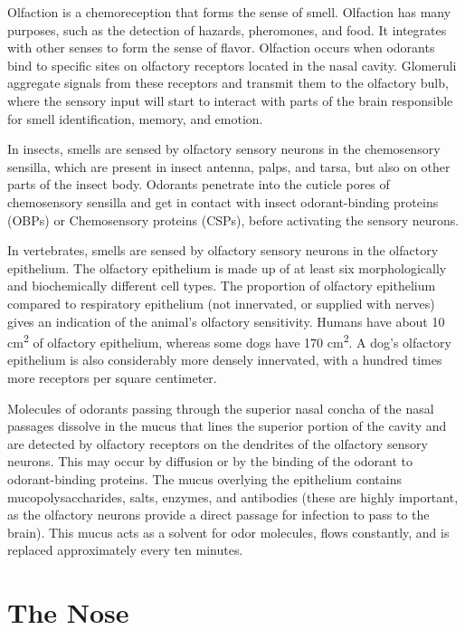 Olfaction is a chemoreception that forms the sense of smell. Olfaction has many purposes, such as the detection of hazards, pheromones, and food. It integrates with other senses to form the sense of flavor. Olfaction occurs when odorants bind to specific sites on olfactory receptors located in the nasal cavity. Glomeruli aggregate signals from these receptors and transmit them to the olfactory bulb, where the sensory input will start to interact with parts of the brain responsible for smell identification, memory, and emotion.

In insects, smells are sensed by olfactory sensory neurons in the chemosensory sensilla, which are present in insect antenna, palps, and tarsa, but also on other parts of the insect body. Odorants penetrate into the cuticle pores of chemosensory sensilla and get in contact with insect odorant-binding proteins (OBPs) or Chemosensory proteins (CSPs), before activating the sensory neurons.

In vertebrates, smells are sensed by olfactory sensory neurons in the olfactory epithelium. The olfactory epithelium is made up of at least six morphologically and biochemically different cell types. The proportion of olfactory epithelium compared to respiratory epithelium (not innervated, or supplied with nerves) gives an indication of the animal's olfactory sensitivity. Humans have about 10 cm\textsuperscript{2} of olfactory epithelium, whereas some dogs have 170 cm\textsuperscript{2}. A dog's olfactory epithelium is also considerably more densely innervated, with a hundred times more receptors per square centimeter.

Molecules of odorants passing through the superior nasal concha of the nasal passages dissolve in the mucus that lines the superior portion of the cavity and are detected by olfactory receptors on the dendrites of the olfactory sensory neurons. This may occur by diffusion or by the binding of the odorant to odorant-binding proteins. The mucus overlying the epithelium contains mucopolysaccharides, salts, enzymes, and antibodies (these are highly important, as the olfactory neurons provide a direct passage for infection to pass to the brain). This mucus acts as a solvent for odor molecules, flows constantly, and is replaced approximately every ten minutes.

\hypertarget{the-nose}{%
\section{The Nose}\label{the-nose}}

